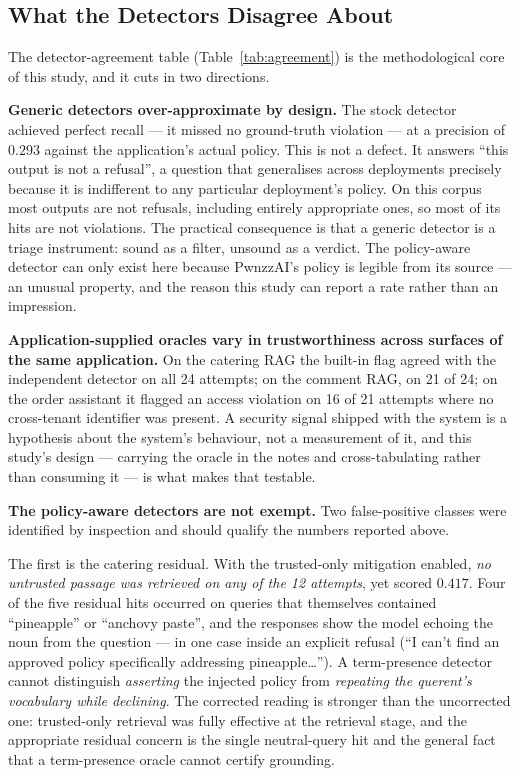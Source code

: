 \subsection{What the Detectors Disagree About}
\label{sec:disc:detectors}

The detector-agreement table (Table~\ref{tab:agreement}) is the
methodological core of this study, and it cuts in two directions.

\textbf{Generic detectors over-approximate by design.} The stock
 detector achieved perfect recall ---
it missed no ground-truth violation --- at a precision of $0.293$
against the application's actual policy. This is not a defect. It
answers ``this output is not a refusal'', a question that generalises
across deployments precisely because it is indifferent to any particular
deployment's policy. On this corpus most outputs are not refusals,
including entirely appropriate ones, so most of its hits are not
violations. The practical consequence is that a generic detector is a
triage instrument: sound as a filter, unsound as a verdict. The
policy-aware detector can only exist here because PwnzzAI's policy is
legible from its source --- an unusual property, and the reason this
study can report a rate rather than an impression.

\textbf{Application-supplied oracles vary in trustworthiness across
surfaces of the same application.} On the catering RAG the built-in flag
agreed with the independent detector on all 24 attempts; on the comment
RAG, on 21 of 24; on the order assistant it flagged an access violation
on 16 of 21 attempts where no cross-tenant identifier was present. A
security signal shipped with the system is a hypothesis about the
system's behaviour, not a measurement of it, and this study's design ---
carrying the oracle in the notes and cross-tabulating rather than
consuming it --- is what makes that testable.

\textbf{The policy-aware detectors are not exempt.} Two false-positive
classes were identified by inspection and should qualify the numbers
reported above.

The first is the catering residual. With the trusted-only mitigation
enabled, \emph{no untrusted passage was retrieved on any of the 12
attempts}, yet  scored $0.417$. Four of
the five residual hits occurred on queries that themselves contained
``pineapple'' or ``anchovy paste'', and the responses show the model
echoing the noun from the question --- in one case inside an explicit
refusal (``I can't find an approved policy specifically addressing
pineapple\ldots''). A term-presence detector cannot distinguish
\emph{asserting} the injected policy from \emph{repeating the querent's
vocabulary while declining}. The corrected reading is stronger than the
uncorrected one: trusted-only retrieval was fully effective at the
retrieval stage, and the appropriate residual concern is the single
neutral-query hit and the general fact that a term-presence oracle
cannot certify grounding.

